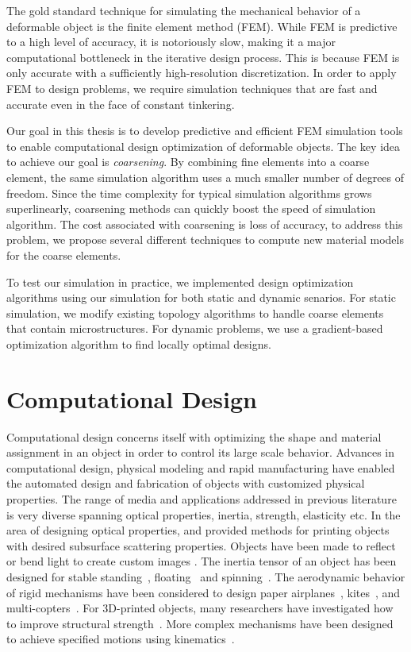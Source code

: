The gold standard technique for simulating the mechanical behavior of a deformable object is the finite element method (FEM).
While FEM is predictive to a high level of accuracy, it is notoriously slow, making it a major computational bottleneck in the iterative design process.
This is because FEM is only accurate with a sufficiently high-resolution discretization.
In order to apply FEM to design problems, we require simulation techniques that are fast and accurate even in the face of constant tinkering.

Our goal in this thesis is to develop predictive and efficient FEM simulation tools to enable computational design optimization of deformable objects.
The key idea to achieve our goal is \textit{coarsening}.
By combining fine elements into a coarse element, the same simulation algorithm uses a much smaller number of degrees of freedom.
Since the time complexity for typical simulation algorithms grows superlinearly,
coarsening methods can quickly boost the speed of simulation algorithm.
The cost associated with coarsening is loss of accuracy,
to address this problem, we propose several different techniques to compute new material models for the coarse elements.

To test our simulation in practice, we implemented design optimization algorithms using our simulation for both static and dynamic senarios.
For static simulation, we modify existing topology algorithms to handle coarse elements that contain microstructures.
For dynamic problems, we use a gradient-based optimization algorithm to find locally optimal designs.

\section{Computational Design}
Computational design concerns itself with optimizing the shape and material assignment in an object in order to control its large scale behavior.
Advances in computational design, physical modeling and rapid manufacturing 
have enabled the automated design and fabrication of objects with customized physical properties.
The range of media and applications addressed in previous literature is very diverse spanning optical properties, inertia, strength, elasticity etc.
In the area of designing optical properties, \citet{Hasan:2010:PRO} and
\citet{Dong:2010:FSS} provided methods for printing objects with desired subsurface scattering properties. Objects have been made to reflect or bend light to create custom images \citep{papas11goal,Weyrich:2009,kiser2013}.
The inertia tensor of an object has been designed for stable standing~\citep{Prevost:2013kb}, floating~\citep{musialski-2015}
and spinning~\citep{Bacher:2014}.
The aerodynamic behavior of rigid mechanisms have been considered to design  paper airplanes~\citep{Umetani:2014}, kites~\citep{Martin:2015}, and multi-copters~\citep{Du:2016}.
For 3D-printed objects, many researchers have investigated how to improve structural strength~\citep{Stava:2012,Zhou:2013,Langlois:2016,Wu:2016,Ulu:2017}.
More complex mechanisms have been designed to achieve specified motions using kinematics~\citep{Zhu:2012,Coros:2013:CDM,Bacher:2015,Megaro:2017}.

